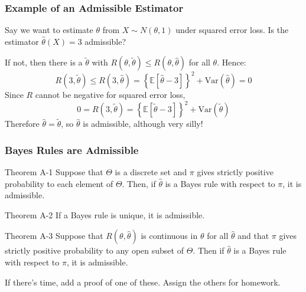 \begin{frame}
  \frametitle{Example of an Admissible Estimator}


    Say we want to estimate $\theta$ from $X\sim N(\theta, 1)$ under squared error loss. 
    Is the estimator $\widehat{\theta}(X) = 3$ admissible?

    \vspace{2em}
    If not, then there is a $\widetilde{\theta}$ with $R(\theta,\widetilde{\theta}) \leq R(\theta,\widehat{\theta})$ for all $\theta$. 
    Hence:
    \[
      R(3, \widetilde{\theta}) \leq R(3, \widehat{\theta}) = \left\{\mathbb{E}\left[\widehat{\theta} - 3  \right] \right\}^2 + \mbox{Var}(\widehat{\theta}) = 0
    \]
    Since $R$ cannot be negative for squared error loss, 
    \[
      0 = R(3,\widetilde{\theta}) = \left\{ \mathbb{E}\left[ \widetilde{\theta} - 3 \right] \right\}^2 + \mbox{Var}(\widetilde{\theta})
    \]
    Therefore $\widehat{\theta} = \widetilde{\theta}$, so $\widehat{\theta}$ is admissible, although very silly!


\end{frame}
\begin{frame}
  \frametitle{Bayes Rules are Admissible}

  \begin{block}{Theorem A-1}
    Suppose that $\Theta$ is a discrete set and $\pi$ gives strictly positive probability to each element of $\Theta$.
    Then, if $\widehat{\theta}$ is a Bayes rule with respect to $\pi$, it is admissible.
  \end{block}

  \begin{block}{Theorem A-2}
    If a Bayes rule is unique, it is admissible.
  \end{block}

  \begin{block}{Theorem A-3}
    Suppose that $R(\theta, \widehat{\theta})$ is continuous in $\theta$ for all $\widehat{\theta}$ and that $\pi$ gives strictly positive probability to any open subset of $\Theta$. 
    Then if $\widehat{\theta}$ is a Bayes rule with respect to $\pi$, it is admissible.
  \end{block}

\end{frame}
\begin{frame}
  If there's time, add a proof of one of these. 
  Assign the others for homework.
\end{frame}

